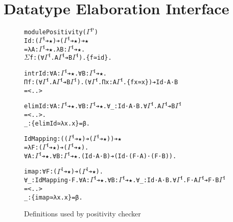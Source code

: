 \documentclass{article}
\newcommand{\splab}[1]{\ensuremath{^{\text{#1}}}}
\begin{document}
\section{Datatype Elaboration Interface}%
\label{sec:generic-interface}%
\begin{figure}[h]
  \caption{Definitions used by positivity checker}
  \label{sfig:elab-toolkit}
{
\begin{alltt}
module Positivity (\(\Gamma\splab{P}\))
Id: (\(\Gamma\splab{I}\) ➔ ★) ➔ (\(\Gamma\splab{I}\) ➔ ★) ➔ ★
= λ A: \(\Gamma\splab{I}\) ➔ ★. λ B: \(\Gamma\splab{I}\) ➔ ★.
  \(\Sigma\) f: (∀ \(\Gamma\splab{I}\). A \(\Gamma\splab{I}\) ➔ B \(\Gamma\splab{I}\)). \{f ≃ id\}.

intrId: ∀ A: \(\Gamma\splab{I}\) ➔ ★. ∀ B: \(\Gamma\splab{I}\) ➔ ★.
  Π f: (∀ \(\Gamma\splab{I}\). A \(\Gamma\splab{I}\) ➔ B \(\Gamma\splab{I}\)). (∀ \(\Gamma\splab{I}\). Π x: A \(\Gamma\splab{I}\). \{f x ≃ x\}) ➔ Id ·A ·B
= <..>

elimId: ∀ A: \(\Gamma\splab{I}\) ➔ ★. ∀ B: \(\Gamma\splab{I}\) ➔ ★. ∀ _: Id ·A ·B. ∀ \(\Gamma\splab{I}\). A \(\Gamma\splab{I}\) ➔ B \(\Gamma\splab{I}\)
= <..>.
_ : \{elimId ≃ λ x. x\} = β.

IdMapping: ((\(\Gamma\splab{I}\) ➔ ★) ➔ (\(\Gamma\splab{I}\) ➔ ★)) ➔ ★
= λ F: (\(\Gamma\splab{I}\) ➔ ★) ➔ (\(\Gamma\splab{I}\) ➔ ★).
  ∀ A: \(\Gamma\splab{I}\) ➔ ★. ∀ B: \(\Gamma\splab{I}\) ➔ ★. (Id ·A ·B) ➔ (Id ·(F ·A) ·(F ·B)).

imap: ∀ F: (\(\Gamma\splab{I}\) ➔ ★) ➔ (\(\Gamma\splab{I}\) ➔ ★).
  ∀ _: IdMapping ·F. ∀ A: \(\Gamma\splab{I}\) ➔ ★. ∀ B: \(\Gamma\splab{I}\) ➔ ★. ∀ _: Id ·A ·B. ∀ \(\Gamma\splab{I}\). F ·A \(\Gamma\splab{I}\) ➔ F ·B \(\Gamma\splab{I}\)
= <..>
_ : \{imap ≃ λ x. x\} = β.
\end{alltt}
}
\end{figure}
\end{document}
